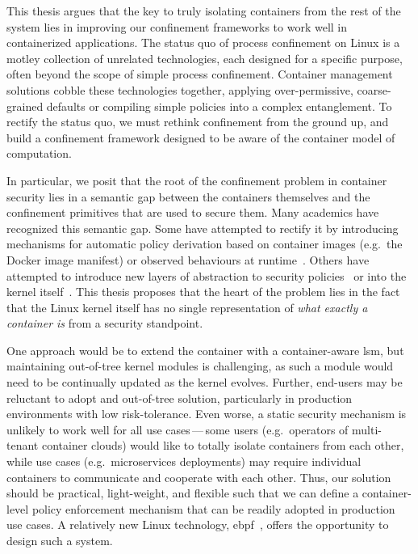 This thesis argues that the key to truly isolating containers from the rest of the system
lies in improving our confinement frameworks to work well in containerized applications.
The status quo of process confinement on Linux is a motley collection of unrelated
technologies, each designed for a specific purpose, often beyond the scope of simple
process confinement. Container management solutions cobble these technologies together,
applying over-permissive, coarse-grained defaults or compiling simple policies into
a complex entanglement. To rectify the status quo, we must rethink confinement from the
ground up, and build a confinement framework designed to be aware of the container model
of computation.

In particular, we posit that the root of the confinement problem in container security
lies in a semantic gap between the containers themselves and the confinement primitives
that are used to secure them. Many academics have recognized this semantic gap. Some have
attempted to rectify it by introducing mechanisms for automatic policy derivation based on
container images (e.g.~the Docker image manifest) or observed behaviours at
runtime~. Others have attempted to introduce new layers of
abstraction to security policies~ or into the kernel
itself~.  This
thesis proposes that the heart of the problem lies in the fact that the Linux kernel
itself has no single representation of \textit{what exactly a container is} from
a security standpoint.

One approach would be to extend the container with a container-aware \gls{lsm}, but
maintaining out-of-tree kernel modules is challenging, as such a module would need to be
continually updated as the kernel evolves. Further, end-users may be reluctant to adopt
and out-of-tree solution, particularly in production environments with low risk-tolerance.
Even worse, a static security mechanism is unlikely to work well for all use
cases\,---\,some users (e.g.~operators of multi-tenant container clouds) would like to
totally isolate containers from each other, while use cases (e.g.~microservices
deployments) may require individual containers to communicate and cooperate with each
other. Thus, our solution should be practical, light-weight, and flexible such that we can
define a container-level policy enforcement mechanism that can be readily adopted in
production use cases. A relatively new Linux technology,
\gls{ebpf}~\cite{starovoitov2014_ebpf, gregg2019_bpf}, offers the opportunity to design
such a system.


